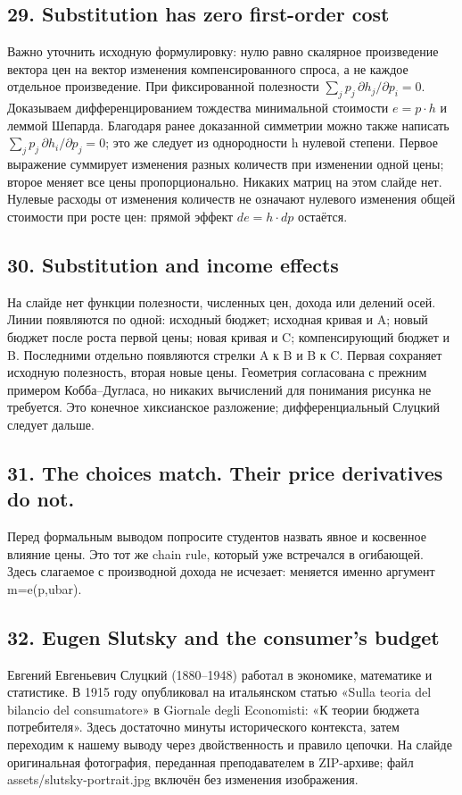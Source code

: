 \documentclass[11pt,a4paper]{article}
\begin{document}
\subsection*{29. Substitution has zero first-order cost}
Важно уточнить исходную формулировку: нулю равно скалярное произведение вектора цен на вектор изменения компенсированного спроса, а не каждое отдельное произведение. При фиксированной полезности $\sum_jp_j\,\partial h_j/\partial p_i=0$. Доказываем дифференцированием тождества минимальной стоимости $e=p\cdot h$ и леммой Шепарда. Благодаря ранее доказанной симметрии можно также написать $\sum_jp_j\,\partial h_i/\partial p_j=0$; это же следует из однородности h нулевой степени. Первое выражение суммирует изменения разных количеств при изменении одной цены; второе меняет все цены пропорционально. Никаких матриц на этом слайде нет. Нулевые расходы от изменения количеств не означают нулевого изменения общей стоимости при росте цен: прямой эффект $de=h\cdot dp$ остаётся.

\subsection*{30. Substitution and income effects}
На слайде нет функции полезности, численных цен, дохода или делений осей. Линии появляются по одной: исходный бюджет; исходная кривая и A; новый бюджет после роста первой цены; новая кривая и C; компенсирующий бюджет и B. Последними отдельно появляются стрелки A к B и B к C. Первая сохраняет исходную полезность, вторая новые цены. Геометрия согласована с прежним примером Кобба--Дугласа, но никаких вычислений для понимания рисунка не требуется. Это конечное хиксианское разложение; дифференциальный Слуцкий следует дальше.

\subsection*{31. The choices match. Their price derivatives do not.}
Перед формальным выводом попросите студентов назвать явное и косвенное влияние цены. Это тот же chain rule, который уже встречался в огибающей. Здесь слагаемое с производной дохода не исчезает: меняется именно аргумент m=e(p,ubar).

\subsection*{32. Eugen Slutsky and the consumer’s budget}
Евгений Евгеньевич Слуцкий (1880--1948) работал в экономике, математике и статистике. В 1915 году опубликовал на итальянском статью «Sulla teoria del bilancio del consumatore» в Giornale degli Economisti: «К теории бюджета потребителя». Здесь достаточно минуты исторического контекста, затем переходим к нашему выводу через двойственность и правило цепочки. На слайде оригинальная фотография, переданная преподавателем в ZIP-архиве; файл assets/slutsky-portrait.jpg включён без изменения изображения.
\end{document}
